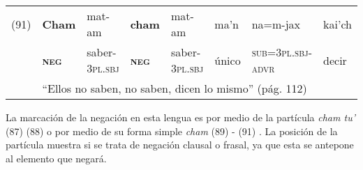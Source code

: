 {%
{\small
\noindent \begin{tabular}{llllllll}
(91) & \textbf{Cham} & mat-am & \textbf{cham} & mat-am & ma’n & na=m-jax & kai’ch \\
& \textsc{\textbf{neg}} & saber-\textsc{3pl.sbj} & \textsc{\textbf{neg}} & saber-\textsc{3pl.sbj} & único & \textsc{sub=3pl.sbj-advr} & decir \\
& \multicolumn{7}{l}{``Ellos no saben, no saben, dicen lo mismo'' (pág. 112)}
\end{tabular} \vspace{0.5cm} }

}

La marcación de la negación en esta lengua es por medio de la partícula {\setmainfont{Charis SIL} \textit{cham tu’}} (87) (88) o por medio de su forma simple {\setmainfont{Charis SIL} \textit{cham}} (89) - (91) \textcolor{MidnightBlue}{\citep{Tepehuano}}. La posición de la partícula muestra si se trata de negación clausal o frasal, ya que esta se antepone al elemento que negará.